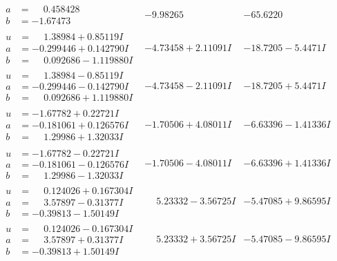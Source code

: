 \documentclass[1p]{elsarticle_modified}
\theoremstyle{definition}
\begin{document}
$$\begin{array}{c|c|c}
\begin{aligned}
a &= \phantom{-}0.458428\phantom{ +0.000000I} \\
b &= -1.67473\phantom{ +0.000000I}\end{aligned}
 & -9.98265\phantom{ +0.000000I} & -65.6220\phantom{ +0.000000I} \\ \hline\begin{aligned}
u &= \phantom{-}1.38984 + 0.85119 I \\
a &= -0.299446 + 0.142790 I \\
b &= \phantom{-}0.092686 - 1.119880 I\end{aligned}
 & -4.73458 + 2.11091 I & -18.7205 - 5.4471 I \\ \hline\begin{aligned}
u &= \phantom{-}1.38984 - 0.85119 I \\
a &= -0.299446 - 0.142790 I \\
b &= \phantom{-}0.092686 + 1.119880 I\end{aligned}
 & -4.73458 - 2.11091 I & -18.7205 + 5.4471 I \\ \hline\begin{aligned}
u &= -1.67782 + 0.22721 I \\
a &= -0.181061 + 0.126576 I \\
b &= \phantom{-}1.29986 + 1.32033 I\end{aligned}
 & -1.70506 + 4.08011 I & -6.63396 - 1.41336 I \\ \hline\begin{aligned}
u &= -1.67782 - 0.22721 I \\
a &= -0.181061 - 0.126576 I \\
b &= \phantom{-}1.29986 - 1.32033 I\end{aligned}
 & -1.70506 - 4.08011 I & -6.63396 + 1.41336 I \\ \hline\begin{aligned}
u &= \phantom{-}0.124026 + 0.167304 I \\
a &= \phantom{-}3.57897 - 0.31377 I \\
b &= -0.39813 - 1.50149 I\end{aligned}
 & \phantom{-}5.23332 - 3.56725 I & -5.47085 + 9.86595 I \\ \hline\begin{aligned}
u &= \phantom{-}0.124026 - 0.167304 I \\
a &= \phantom{-}3.57897 + 0.31377 I \\
b &= -0.39813 + 1.50149 I\end{aligned}
 & \phantom{-}5.23332 + 3.56725 I & -5.47085 - 9.86595 I \\ \hline\begin{aligned}

\end{aligned}
\end{array}$$
\end{document}
